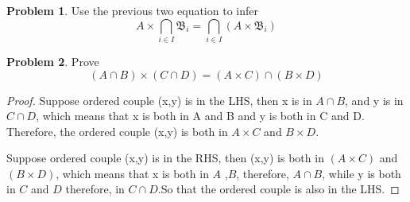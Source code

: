 \documentclass[a4paper,11pt]{article}%
\theoremstyle{remark}
\theoremstyle{definition}
\newtheorem{problem}{Problem}[subsection]
\begin{document}
\begin{problem}
    Use the previous two equation to infer 
    \[A\times \bigcap_{i\in I}\mathfrak{B}_i=\bigcap_{i\in I}(A\times \mathfrak{B}_i)\]
\end{problem}
\begin{problem}
   Prove 
   \[(A\cap B)\times (C\cap D)=(A\times C)\cap(B\times D)\]
\begin{proof}
   Suppose ordered couple (x,y) is in the LHS, then x is in $A\cap B$, and
   y is in $C\cap D$, which means that x is both in A and B and y is both
   in C and D. Therefore, the ordered couple (x,y) is both in $A\times C$ and
   $B\times D$. 

    Suppose ordered couple (x,y) is in the RHS, then (x,y) is both in $(A\times C)$
    and $(B\times D)$, which means that x is both in $A$ ,$B$, therefore, $A\cap B$, while y is both in $C$ and $D$ 
    therefore, in $C\cap D$.So that the ordered couple is also in the LHS.
\end{proof}
\end{problem}
\end{document}
